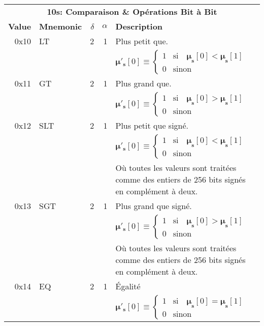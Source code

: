 \documentclass[9pt,oneside]{amsart}
\begin{document}
\begin{tabular*}{\columnwidth}[h]{rlrrl}
\toprule
\multicolumn{5}{c}{\textbf{10s: Comparaison \& Opérations Bit à Bit }} \\
\textbf{Value} & \textbf{Mnemonic} & $\delta$ & $\alpha$ & \textbf{Description} \vspace{5pt} \\
0x10 & {\small LT} & 2 & 1 & Plus petit que. \\
&&&& $\boldsymbol{\mu}'_\mathbf{s}[0] \equiv \begin{cases} 1 & \text{si} \quad \boldsymbol{\mu}_\mathbf{s}[0] < \boldsymbol{\mu}_\mathbf{s}[1] \\ 0 & \text{sinon} \end{cases}$ \\
\midrule
0x11 & {\small GT} & 2 & 1 & Plus grand que. \\
&&&& $\boldsymbol{\mu}'_\mathbf{s}[0] \equiv \begin{cases} 1 & \text{si} \quad \boldsymbol{\mu}_\mathbf{s}[0] > \boldsymbol{\mu}_\mathbf{s}[1] \\ 0 & \text{sinon} \end{cases}$ \\
\midrule
0x12 & {\small SLT} & 2 & 1 & Plus petit que signé. \\
&&&& $\boldsymbol{\mu}'_\mathbf{s}[0] \equiv \begin{cases} 1 & \text{si} \quad \boldsymbol{\mu}_\mathbf{s}[0] < \boldsymbol{\mu}_\mathbf{s}[1] \\ 0 & \text{sinon} \end{cases}$ \\
&&&& Où toutes les valeurs sont traitées comme des entiers de 256 bits signés en complément à deux. \\
\midrule
0x13 & {\small SGT} & 2 & 1 & Plus grand que signé. \\
&&&& $\boldsymbol{\mu}'_\mathbf{s}[0] \equiv \begin{cases} 1 & \text{si} \quad \boldsymbol{\mu}_\mathbf{s}[0] > \boldsymbol{\mu}_\mathbf{s}[1] \\ 0 & \text{sinon} \end{cases}$ \\
&&&& Où toutes les valeurs sont traitées comme des entiers de 256 bits signés en complément à deux. \\
\midrule
0x14 & {\small EQ} & 2 & 1 & Égalité \\
&&&& $\boldsymbol{\mu}'_\mathbf{s}[0] \equiv \begin{cases} 1 & \text{si} \quad \boldsymbol{\mu}_\mathbf{s}[0] = \boldsymbol{\mu}_\mathbf{s}[1] \\ 0 & \text{sinon} \end{cases}$ \\

\end{tabular*}
\end{document}
